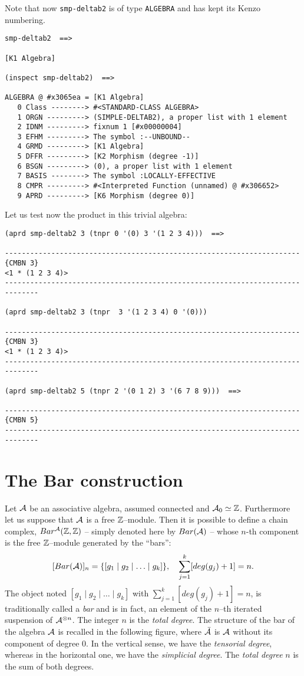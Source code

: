 Note that now {\tt smp-deltab2}  is of type {\tt ALGEBRA} and has kept
its Kenzo numbering.
{\footnotesize\begin{verbatim}
smp-deltab2  ==>

[K1 Algebra]

(inspect smp-deltab2)  ==>

ALGEBRA @ #x3065ea = [K1 Algebra]
   0 Class --------> #<STANDARD-CLASS ALGEBRA>
   1 ORGN ---------> (SIMPLE-DELTAB2), a proper list with 1 element
   2 IDNM ---------> fixnum 1 [#x00000004]
   3 EFHM ---------> The symbol :--UNBOUND--
   4 GRMD ---------> [K1 Algebra]
   5 DFFR ---------> [K2 Morphism (degree -1)]
   6 BSGN ---------> (0), a proper list with 1 element
   7 BASIS --------> The symbol :LOCALLY-EFFECTIVE
   8 CMPR ---------> #<Interpreted Function (unnamed) @ #x306652>
   9 APRD ---------> [K6 Morphism (degree 0)]
\end{verbatim}}
Let us test now the product in this trivial algebra:
{\footnotesize\begin{verbatim}
(aprd smp-deltab2 3 (tnpr 0 '(0) 3 '(1 2 3 4)))  ==>

----------------------------------------------------------------------{CMBN 3}
<1 * (1 2 3 4)>
------------------------------------------------------------------------------

(aprd smp-deltab2 3 (tnpr  3 '(1 2 3 4) 0 '(0)))

----------------------------------------------------------------------{CMBN 3}
<1 * (1 2 3 4)>
------------------------------------------------------------------------------

(aprd smp-deltab2 5 (tnpr 2 '(0 1 2) 3 '(6 7 8 9)))  ==>

----------------------------------------------------------------------{CMBN 5}
------------------------------------------------------------------------------
\end{verbatim}}

\section {The Bar construction}

Let $\cal A$ be an associative algebra, assumed connected and  ${\cal A}_0 \simeq {\mathbb{Z}}$.
Furthermore let us suppose that ${\cal A}$ is a free ${\mathbb{Z}}$--module. Then it is possible
to define a chain complex, $Bar^{\cal A}({\mathbb{Z}}, {\mathbb{Z}})$ -- simply denoted here by $Bar({\cal A})$ --
whose $n$-th component is the free ${\mathbb{Z}}$--module generated by the ``bars'':
$$ [Bar({\cal A})]_n = \{ [g_1 \mid g_2 \mid \ldots \mid g_k] \}, \quad \sum_{j=1}^{k} [deg(g_j)+1] =n. $$
The object noted $[g_1 \mid g_2 \mid \ldots \mid g_k]$
with $\sum_{j=1}^{k} [deg(g_j)+1] =n$, is tra\-di\-ti\-o\-nal\-ly
called a {\em bar} and is in fact,  an element of the $n$--th iterated suspension of
${\cal A}^{\otimes n}$. The integer $n$ is the {\em total degree}. The structure of
the bar of the algebra ${\cal A}$ is recalled in the following figure, where $\bar{\cal A}$
is ${\cal A}$ without its component of degree $0$. In the vertical sense, we have the {\em tensorial degree},
whereas in the horizontal one, we have the {\em simplicial degree}. The {\em total degree} $n$ is the
sum of both degrees.

